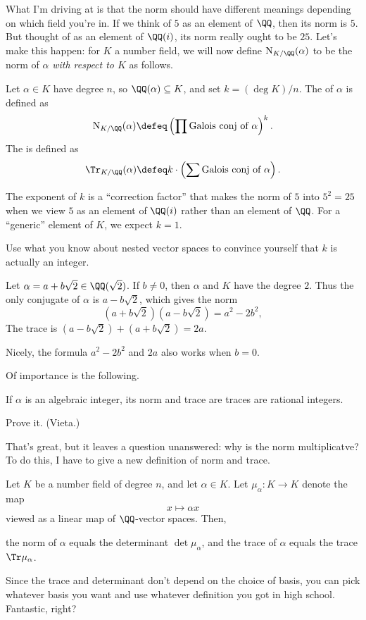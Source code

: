 What I'm driving at is that the norm should have different meanings depending on which field you're in.
If we think of $5$ as an element of $\QQ$, then its norm is $5$.
But thought of as an element of $\QQ(i)$, its norm really ought to be $25$.
Let's make this happen: for $K$ a number field, we will now define $\Norm_{K/\QQ}(\alpha)$
to be the norm of $\alpha$ \emph{with respect to $K$} as follows.
\begin{definition}
	Let $\alpha \in K$ have degree $n$, so $\QQ(\alpha) \subseteq K$, and set $k = (\deg K) / n$.
	The  of $\alpha$ is defined as
	\[ \Norm_{K/\QQ}(\alpha) \defeq \left( \prod \text{Galois conj of $\alpha$} \right)^k. \]
	The  is defined as
	\[ \Tr_{K/\QQ}(\alpha) \defeq k \cdot \left( \sum \text{Galois conj of $\alpha$} \right). \]
\end{definition}
The exponent of $k$ is a ``correction factor'' that makes the norm of $5$ into $5^2=25$
when we view $5$ as an element of $\QQ(i)$ rather than an element of $\QQ$.
For a ``generic'' element of $K$, we expect $k = 1$.
\begin{exercise}
	Use what you know about nested vector spaces to convince
	yourself that $k$ is actually an integer.
\end{exercise}
\begin{example}
	Let $\alpha = a+b\sqrt2 \in \QQ(\sqrt2)$.
	If $b \neq 0$, then $\alpha$ and $K$ have the degree $2$.
	Thus the only conjugate of $\alpha$ is $a-b\sqrt2$, which gives
	the norm \[ (a+b\sqrt2)(a-b\sqrt2) = a^2-2b^2, \]
	The trace is $(a-b\sqrt2) + (a+b\sqrt2) = 2a$.

	Nicely, the formula $a^2-2b^2$ and $2a$ also works when $b=0$.
\end{example}
Of importance is the following.
\begin{proposition}
	If $\alpha$ is an algebraic integer, its norm and trace are traces 
	are rational integers.
\end{proposition}
\begin{ques}
	Prove it. (Vieta.)
\end{ques}

That's great, but it leaves a question unanswered:
why is the norm multiplicatve?
To do this, I have to give a new definition of norm and trace.

\begin{theorem}
	Let $K$ be a number field of degree $n$, and let $\alpha \in K$.
	Let $\mu_\alpha : K \to K$ denote the map \[ x \mapsto \alpha x \]
	viewed as a linear map of $\QQ$-vector spaces.
	Then,
	\begin{itemize}
		\ii the norm of $\alpha$ equals the determinant $\det \mu_\alpha$, and
		\ii the trace of $\alpha$ equals the trace $\Tr \mu_\alpha$.
	\end{itemize} 
\end{theorem}
Since the trace and determinant don't depend on the choice of basis,
you can pick whatever basis you want
and use whatever definition you got in high school.
Fantastic, right?

